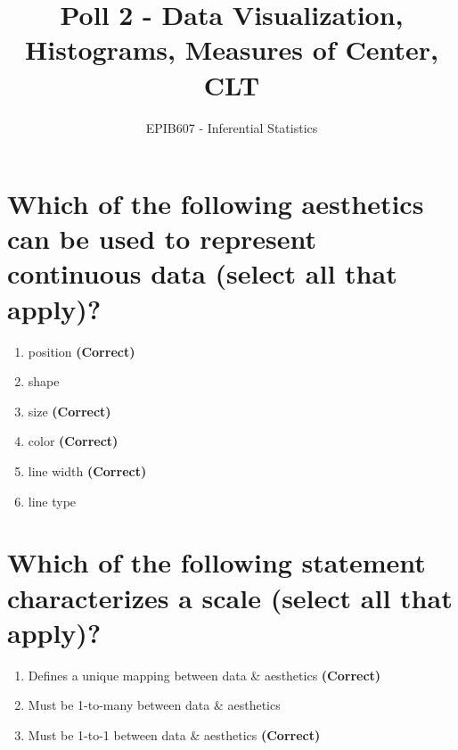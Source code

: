 \documentclass[letterpaper,10pt,twoside,printwatermark=false]{pinp}
\title{Poll 2 - Data Visualization, Histograms, Measures of Center, CLT}
\author[a]{EPIB607 - Inferential Statistics}
\affil[a]{Fall 2018, McGill University}
\providecommand{\tightlist}{%
  \setlength{\itemsep}{0pt}\setlength{\parskip}{0pt}}
\begin{document}
\verticaladjustment{-2pt}

\maketitle
\thispagestyle{firststyle}



\section{Which of the following aesthetics can be used to represent
continuous data (select all that
apply)?}\label{which-of-the-following-aesthetics-can-be-used-to-represent-continuous-data-select-all-that-apply}

\begin{enumerate}
\def\labelenumi{\arabic{enumi}.}
\tightlist
\item
  position \textbf{(Correct)}
\item
  shape
\item
  size \textbf{(Correct)}
\item
  color \textbf{(Correct)}
\item
  line width \textbf{(Correct)}
\item
  line type
\end{enumerate}

\section{Which of the following statement characterizes a scale (select
all that
apply)?}\label{which-of-the-following-statement-characterizes-a-scale-select-all-that-apply}

\begin{enumerate}
\def\labelenumi{\arabic{enumi}.}
\tightlist
\item
  Defines a unique mapping between data \& aesthetics \textbf{(Correct)}
\item
  Must be 1-to-many between data \& aesthetics
\item
  Must be 1-to-1 between data \& aesthetics \textbf{(Correct)}
\end{enumerate}
\end{document}
